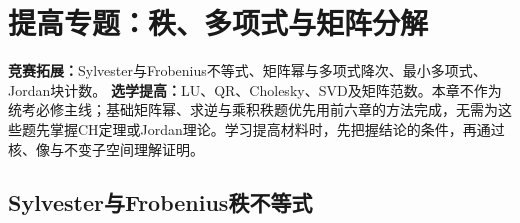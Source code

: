 \chapter{提高专题：秩、多项式与矩阵分解}\label{ch:advanced}
\begin{examtip}
\textbf{竞赛拓展：}Sylvester与Frobenius不等式、矩阵幂与多项式降次、最小多项式、Jordan块计数。
\textbf{选学提高：}LU、QR、Cholesky、SVD及矩阵范数。本章不作为统考必修主线；基础矩阵幂、求逆与乘积秩题优先用前六章的方法完成，无需为这些题先掌握CH定理或Jordan理论。学习提高材料时，先把握结论的条件，再通过核、像与不变子空间理解证明。
\end{examtip}
\section{Sylvester与Frobenius秩不等式}
